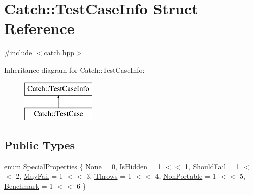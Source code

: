 \hypertarget{struct_catch_1_1_test_case_info}{}\section{Catch\+:\+:Test\+Case\+Info Struct Reference}
\label{struct_catch_1_1_test_case_info}


{\ttfamily \#include $<$catch.\+hpp$>$}

Inheritance diagram for Catch\+:\+:Test\+Case\+Info\+:\begin{figure}[H]
\begin{center}
\leavevmode
\includegraphics[height=2.000000cm]{struct_catch_1_1_test_case_info}
\end{center}
\end{figure}
\subsection*{Public Types}
\begin{DoxyCompactItemize}
\item 
enum \mbox{\hyperlink{struct_catch_1_1_test_case_info_a39b232f74b4a7a6f2183b96759027eac}{Special\+Properties}} \{ \newline
\mbox{\hyperlink{struct_catch_1_1_test_case_info_a39b232f74b4a7a6f2183b96759027eacaf94e9de5f8ec1e53b1aa761ec564b31a}{None}} = 0, 
\mbox{\hyperlink{struct_catch_1_1_test_case_info_a39b232f74b4a7a6f2183b96759027eacaeda53906c14c3973e0980900c132b8f7}{Is\+Hidden}} = 1 $<$$<$ 1, 
\mbox{\hyperlink{struct_catch_1_1_test_case_info_a39b232f74b4a7a6f2183b96759027eacaf9002285bccfc343935958f3953f4c01}{Should\+Fail}} = 1 $<$$<$ 2, 
\mbox{\hyperlink{struct_catch_1_1_test_case_info_a39b232f74b4a7a6f2183b96759027eacadf1873d3271121cb9f52d7df45b416ca}{May\+Fail}} = 1 $<$$<$ 3, 
\newline
\mbox{\hyperlink{struct_catch_1_1_test_case_info_a39b232f74b4a7a6f2183b96759027eaca4704adf89ed7f7ad653d08f99813a974}{Throws}} = 1 $<$$<$ 4, 
\mbox{\hyperlink{struct_catch_1_1_test_case_info_a39b232f74b4a7a6f2183b96759027eaca06472887b53fda9eb8015d74e7fd2cf1}{Non\+Portable}} = 1 $<$$<$ 5, 
\mbox{\hyperlink{struct_catch_1_1_test_case_info_a39b232f74b4a7a6f2183b96759027eacad0e25e337246ae34d555fe53baf81c16}{Benchmark}} = 1 $<$$<$ 6
 \}
\end{DoxyCompactItemize}

